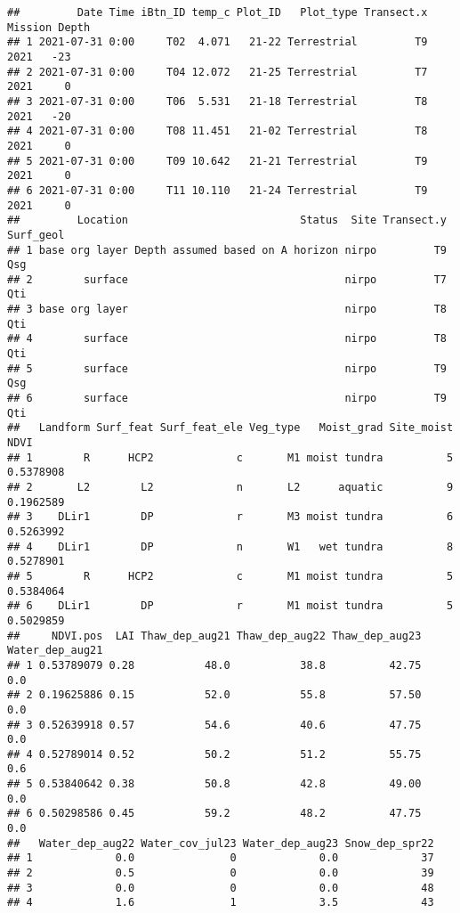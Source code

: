 \documentclass[
]{article}
\begin{document}
\begin{verbatim}
##         Date Time iBtn_ID temp_c Plot_ID   Plot_type Transect.x Mission Depth
## 1 2021-07-31 0:00     T02  4.071   21-22 Terrestrial         T9    2021   -23
## 2 2021-07-31 0:00     T04 12.072   21-25 Terrestrial         T7    2021     0
## 3 2021-07-31 0:00     T06  5.531   21-18 Terrestrial         T8    2021   -20
## 4 2021-07-31 0:00     T08 11.451   21-02 Terrestrial         T8    2021     0
## 5 2021-07-31 0:00     T09 10.642   21-21 Terrestrial         T9    2021     0
## 6 2021-07-31 0:00     T11 10.110   21-24 Terrestrial         T9    2021     0
##         Location                           Status  Site Transect.y Surf_geol
## 1 base org layer Depth assumed based on A horizon nirpo         T9       Qsg
## 2        surface                                  nirpo         T7       Qti
## 3 base org layer                                  nirpo         T8       Qti
## 4        surface                                  nirpo         T8       Qti
## 5        surface                                  nirpo         T9       Qsg
## 6        surface                                  nirpo         T9       Qti
##   Landform Surf_feat Surf_feat_ele Veg_type   Moist_grad Site_moist      NDVI
## 1        R      HCP2             c       M1 moist tundra          5 0.5378908
## 2       L2        L2             n       L2      aquatic          9 0.1962589
## 3    DLir1        DP             r       M3 moist tundra          6 0.5263992
## 4    DLir1        DP             n       W1   wet tundra          8 0.5278901
## 5        R      HCP2             c       M1 moist tundra          5 0.5384064
## 6    DLir1        DP             r       M1 moist tundra          5 0.5029859
##     NDVI.pos  LAI Thaw_dep_aug21 Thaw_dep_aug22 Thaw_dep_aug23 Water_dep_aug21
## 1 0.53789079 0.28           48.0           38.8          42.75             0.0
## 2 0.19625886 0.15           52.0           55.8          57.50             0.0
## 3 0.52639918 0.57           54.6           40.6          47.75             0.0
## 4 0.52789014 0.52           50.2           51.2          55.75             0.6
## 5 0.53840642 0.38           50.8           42.8          49.00             0.0
## 6 0.50298586 0.45           59.2           48.2          47.75             0.0
##   Water_dep_aug22 Water_cov_jul23 Water_dep_aug23 Snow_dep_spr22
## 1             0.0               0             0.0             37
## 2             0.5               0             0.0             39
## 3             0.0               0             0.0             48
## 4             1.6               1             3.5             43

\end{verbatim}
\end{document}
